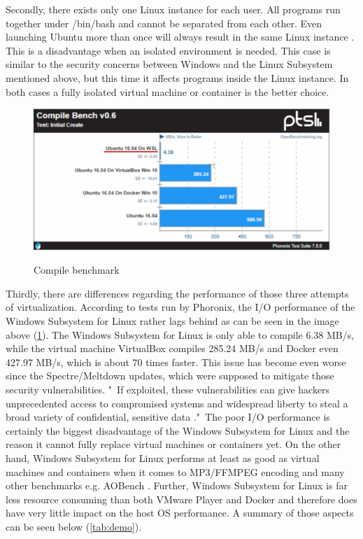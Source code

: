 \documentclass[utf8,biblatex, ngerman, english]{lni}
\begin{document}
Secondly, there exists only one Linux instance for each user. All programs run together under /bin/bash and cannot be separated from each other. Even launching Ubuntu more than once will always result in the same Linux instance \cite{Ha16b}. This is a disadvantage when an isolated environment is needed. This case is similar to the security concerns between Windows and the Linux Subsystem mentioned above, but this time it affects programs inside the Linux instance. In both cases a fully isolated virtual machine or container is the better choice.

\begin{figure}
  \centering
  \includegraphics[width=1\textwidth]{CompileSpeed.pdf}
  \caption{Compile benchmark} \cite{La18} 
  \label{img:speed}
\end{figure}

Thirdly, there are differences regarding the performance of those three attempts of virtualization. According to tests run by Phoronix, the I/O performance of the Windows Subsystem for Linux rather lags behind as can be seen in the image above (\ref{img:speed}). The Windows Subsystem for Linux is only able to compile 6.38 MB/s, while the virtual machine VirtualBox compiles 285.24 MB/s and Docker even 427.97 MB/s, which is about 70 times faster. This issue has become even worse since the Spectre/Meltdown updates, which were supposed to mitigate those security vulnerabilities. "\ If exploited, these vulnerabilities can give hackers unprecedented access to compromised systems and widespread liberty to steal a broad variety of confidential, sensitive data \cite{Pe18}."\ The poor I/O performance is certainly the biggest disadvantage of the Windows Subsystem for Linux and the reason it cannot fully replace virtual machines or containers yet. On the other hand, Windows Subsystem for Linux performs at least as good as virtual machines and containers when it comes to MP3/FFMPEG encoding and many other benchmarks e.g. AOBench \cite{La18}. Further, Windows Subsystem for Linux is far less resource consuming than both VMware Player and Docker and therefore does have very little impact on the host OS performance. A summary of those aspects can be seen below (\ref{tab:demo}).
\end{document}
